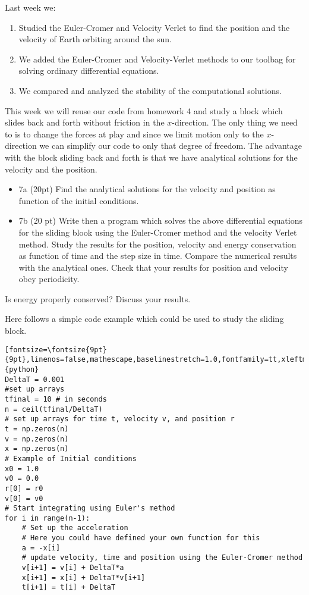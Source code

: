 \documentclass[%
oneside,                 %
final,                   %
10pt]{article}
\begin{document}
Last week we:
\begin{enumerate}
\item Studied  the Euler-Cromer and Velocity Verlet  to find the position and the velocity of  Earth orbiting around the sun.

\item We added the Euler-Cromer and Velocity-Verlet methods to our toolbag for solving ordinary differential equations.

\item We compared and analyzed the stability of the  computational solutions.
\end{enumerate}

\noindent
This week we will reuse our code from homework 4 and study a block
which slides back and forth without friction in the $x$-direction.
The only thing we need to is to change the forces at play and since we
limit motion only to the $x$-direction we can simplify our code to
only that degree of freedom.
The advantage with the block sliding back and forth is that we have analytical solutions for the velocity and the position. 


\begin{itemize}
\item 7a (20pt) Find the analytical solutions for the velocity and position as function of the initial conditions. 

\item 7b (20 pt)  Write then a program which solves the above differential equations for the sliding blook using the Euler-Cromer  method and the velocity Verlet method. Study the results for the position, velocity and energy conservation as function of time and the step size in time. Compare the numerical results with the analytical ones. Check that your results for position and velocity obey periodicity. 
\end{itemize}

\noindent
Is energy properly conserved? Discuss your results. 

Here follows a simple code example which could be used to study the sliding block.
\begin{verbatim}[fontsize=\fontsize{9pt}{9pt},linenos=false,mathescape,baselinestretch=1.0,fontfamily=tt,xleftmargin=7mm]{python}
DeltaT = 0.001
#set up arrays 
tfinal = 10 # in seconds
n = ceil(tfinal/DeltaT)
# set up arrays for time t, velocity v, and position r
t = np.zeros(n)
v = np.zeros(n)
x = np.zeros(n)
# Example of Initial conditions
x0 = 1.0
v0 = 0.0
r[0] = r0
v[0] = v0
# Start integrating using Euler's method
for i in range(n-1):
    # Set up the acceleration
    # Here you could have defined your own function for this
    a = -x[i]
    # update velocity, time and position using the Euler-Cromer method
    v[i+1] = v[i] + DeltaT*a
    x[i+1] = x[i] + DeltaT*v[i+1]
    t[i+1] = t[i] + DeltaT
\end{verbatim}
\end{document}

